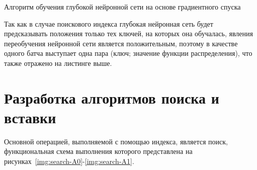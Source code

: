 \begin{algorithm}[H]
    \caption{Алгоритм обучения глубокой нейронной сети на основе градиентного
    спуска}
    \label{alg:sdg}
    \small


\end{algorithm}
\vspace{0.5cm}

Так как в случае поискового индекса глубокая нейронная сеть будет предсказывать
положения только тех ключей, на которых она обучалась, явления переобучения
нейронной сети является положительным, поэтому в качестве одного батча выступает
одна пара (ключ; значение функции распределения), что также отражено на листинге
выше.

\section{Разработка алгоритмов поиска и вставки}
Основной операцией, выполняемой с помощью индекса, является поиск,
функциональная схема выполнения которого представлена на
рисунках~\ref{img:search-A0}-\ref{img:search-A1}.

